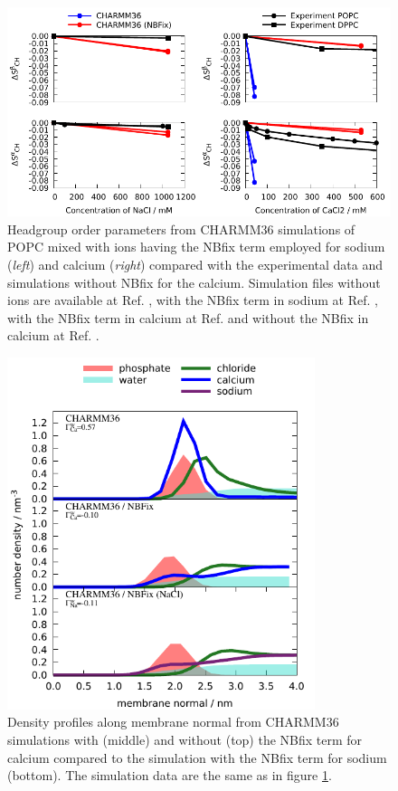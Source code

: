 \documentclass[journal=jpcbfk]{achemso}
\begin{document}
\begin{figure}[]
  \centering
  \includegraphics[width=17.0cm]{../Figs/OP_CHARMM_CaCl_POPC_NBFix.pdf}
  \caption{\label{OP_CHARMM_CaCl_POPC_NBFix}
    Headgroup order parameters from CHARMM36 simulations of POPC mixed with ions having
    the NBfix term employed for sodium \cite{venable13} ({\it left})
    and calcium \cite{kim16} ({\it right}) compared with the experimental data \cite{akutsu81,altenbach84}
    and simulations without NBfix for the calcium.
    Simulation files without ions are available at Ref. ,
    with the NBfix term in sodium at Ref. , 
    with the NBfix term in calcium at Ref.  and
    without the NBfix in calcium at Ref. .
  }
\end{figure}

\begin{figure}[]
  \centering
  \includegraphics[width=9.0cm]{../Figs/density_profile_CHARMM_CaCl_POPC_NBFix.pdf}
  \caption{\label{density_profile_CHARMM_CaCl_POPC_NBFix}
    Density profiles along membrane normal from CHARMM36 simulations with (middle)
    and without (top) the NBfix term for calcium \cite{kim16} compared to the simulation
    with the NBfix term for sodium \cite{venable13} (bottom). The simulation data are the same as in figure \ref{OP_CHARMM_CaCl_POPC_NBFix}.
  }
\end{figure}
\end{document}
